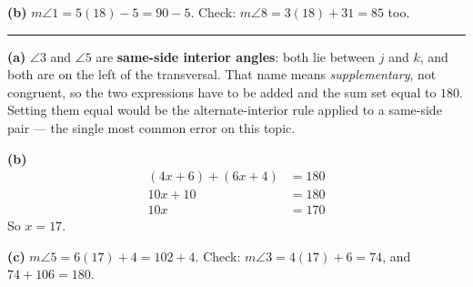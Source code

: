 \documentclass[12pt]{article}
\begin{document}
\textbf{(b)} $m\angle 1 = 5(18) - 5 = 90 - 5$. Check: $m\angle 8 = 3(18) + 31 = 85$ too. 

\vspace{0.2cm}\noindent\rule{\linewidth}{0.2pt}


\textbf{(a)} $\angle 3$ and $\angle 5$ are \textbf{same-side interior angles}: both lie between $j$ and $k$, and both are on the left of the transversal. That name means \emph{supplementary}, not congruent, so the two expressions have to be added and the sum set equal to $180$. Setting them equal would be the alternate-interior rule applied to a same-side pair --- the single most common error on this topic.

\textbf{(b)}
\begin{align*}
  (4x + 6) + (6x + 4) &= 180 \\
  10x + 10 &= 180 \\
  10x &= 170
\end{align*}
So $x = 17$. 

\textbf{(c)} $m\angle 5 = 6(17) + 4 = 102 + 4$. Check: $m\angle 3 = 4(17) + 6 = 74$, and $74 + 106 = 180$. 
\end{document}
